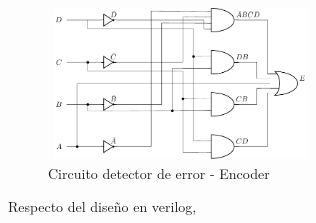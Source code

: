 \begin{figure}[H]
\centering
\includegraphics[width=7cm,height=4cm]{Ejercicio_3/Circuitos/Circuito_ENCODER_ERROR.pdf}
\caption{Circuito detector de error - Encoder}
\label{fig:Circuito_ENCODER_ERROR}
\end{figure}
Respecto del diseño en verilog,
